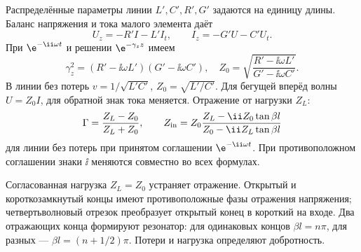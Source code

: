 
Распределённые параметры линии $L',C',R',G'$ задаются на единицу длины. Баланс напряжения и тока малого элемента даёт
\begin{equation}
 U_z=-R'I-L'I_t,\qquad I_z=-G'U-C'U_t.
\end{equation}
При $\e^{-\ii\omega t}$ и решении $\e^{-\gamma_z z}$ имеем
\begin{equation}
 \gamma_z^2=(R'-\ii\omega L')(G'-\ii\omega C'),\quad
 Z_0=\sqrt{\frac{R'-\ii\omega L'}{G'-\ii\omega C'}}.
\end{equation}
В линии без потерь $v=1/\sqrt{L'C'}$, $Z_0=\sqrt{L'/C'}$. Для бегущей вперёд волны $U=Z_0I$, для обратной знак тока меняется. Отражение от нагрузки $Z_L$:
\begin{equation}
 \Gamma=\frac{Z_L-Z_0}{Z_L+Z_0},\qquad
 Z_{\rm in}=Z_0\frac{Z_L-\ii Z_0\tan\beta l}{Z_0-\ii Z_L\tan\beta l}
\end{equation}
для линии без потерь при принятом соглашении $\e^{-\ii\omega t}$. При противоположном соглашении знаки $\ii$ меняются совместно во всех формулах.


Согласованная нагрузка $Z_L=Z_0$ устраняет отражение. Открытый и короткозамкнутый концы имеют противоположные фазы отражения напряжения; четвертьволновый отрезок преобразует открытый конец в короткий на входе. Два отражающих конца формируют резонатор: для одинаковых концов $\beta l=n\pi$, для разных — $\beta l=(n+1/2)\pi$. Потери и нагрузка определяют добротность.
